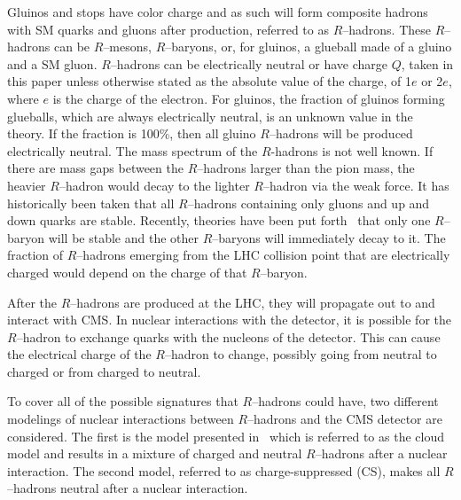 Gluinos and stops have color charge and as such will form composite hadrons with SM quarks and gluons after production, referred to as $R$--hadrons.
These $R$--hadrons can be $R$--mesons, $R$--baryons, or, for gluinos, a glueball made of a gluino and a SM gluon.
$R$--hadrons can be electrically neutral or have charge $Q$, taken in this paper unless otherwise stated as the absolute value of the charge,
of 1$e$ or 2$e$, where $e$ is the charge of the electron.
For gluinos, the fraction of gluinos forming glueballs, which are always electrically neutral, is
an unknown value in the theory. If the fraction is 100\%, then all gluino $R$--hadrons will be produced electrically neutral.
The mass spectrum of the $R$-hadrons is not well known.
If there are mass gaps between the $R$--hadrons larger than the pion mass, the heavier $R$--hadron would decay to the lighter $R$--hadron via the weak force.
It has historically been taken that all $R$--hadrons containing only gluons and up and down quarks are stable.
Recently, theories have been put forth~\cite{Mackeprang:2009ad} that only one $R$--baryon will be stable and the other $R$--baryons will immediately decay to it.
The fraction of $R$--hadrons emerging from the LHC collision point that are electrically charged would depend on the charge of that $R$--baryon.



After the $R$--hadrons are produced at the LHC, they will propagate out to and interact with CMS.
In nuclear interactions with the detector, it is possible for the 
$R$--hadron to exchange quarks with the nucleons of the detector.
This can cause the
electrical charge of the $R$--hadron to change, possibly going from neutral
to charged or from charged to neutral. 

To cover all of the possible signatures that $R$--hadrons could have, two different modelings of nuclear interactions between $R$--hadrons and the CMS detector are considered.
The first is the model presented in~\cite{Kraan:2004tz, Mackeprang:2006gx}
which is referred to as the cloud model and results in a mixture of charged and neutral $R$--hadrons after a nuclear interaction.
The second model, referred to as charge-suppressed (CS), makes all $R$--hadrons neutral after a nuclear interaction.


